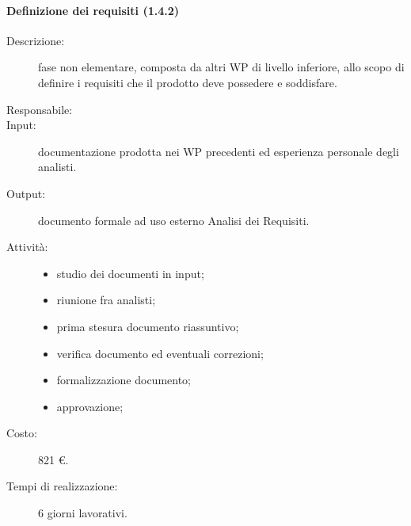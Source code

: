 \paragraph{Definizione dei requisiti (1.4.2)}
\begin{description}
\item[Descrizione:] fase non elementare, composta da altri WP di livello inferiore, allo scopo di definire i requisiti che il prodotto deve possedere e soddisfare.
\item[Responsabile:] 
\item[Input:] documentazione prodotta nei WP precedenti ed esperienza personale degli analisti.
\item[Output:] documento formale ad uso esterno Analisi dei Requisiti.
\item[Attività:] 
\begin{center}
\begin{itemize}
\item studio dei documenti in input;
\item riunione fra analisti;
\item prima stesura documento riassuntivo;
\item verifica documento ed eventuali correzioni;
\item formalizzazione documento;
\item approvazione;
\end{itemize}
\end{center}
\item[Costo:] 821 \euro{}.
\item[Tempi di realizzazione:] 6 giorni lavorativi.
\end{description}

